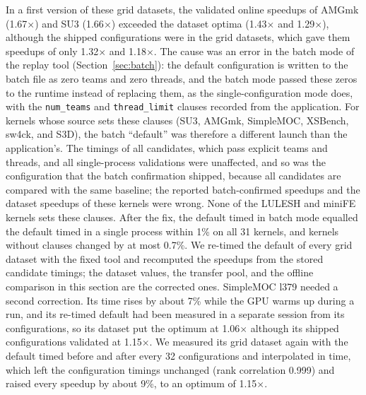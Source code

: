 \documentclass[10pt]{article}
\newcommand{\x}{\ensuremath{\times}}
\newcommand{\code}[1]{\texttt{#1}}
\begin{document}
In a first version of these grid datasets, the validated online speedups of
AMGmk (1.67\x{}) and SU3 (1.66\x{}) exceeded the dataset optima (1.43\x{} and
1.29\x{}), although the shipped configurations were in the grid datasets, which
gave them speedups of only 1.32\x{} and 1.18\x{}. The cause was an error in the
batch mode of the replay tool (Section~\ref{sec:batch}): the default
configuration is written to the batch file as zero teams and zero threads, and
the batch mode passed these zeros to the runtime instead of replacing them, as
the single-configuration mode does, with the \code{num\_teams} and
\code{thread\_limit} clauses recorded from the application. For kernels whose
source sets these clauses (SU3, AMGmk, SimpleMOC, XSBench, sw4ck, and S3D), the
batch ``default'' was therefore a different launch than the application's. The
timings of all candidates, which pass explicit teams and threads, and all
single-process validations were unaffected, and so was the configuration that
the batch confirmation shipped, because all candidates are compared with the
same baseline; the reported batch-confirmed speedups and the dataset speedups
of these kernels were wrong. None of the LULESH and miniFE kernels sets these
clauses. After the fix, the default timed in batch mode equalled the default
timed in a single process within 1\% on all 31 kernels, and kernels without
clauses changed by at most 0.7\%. We re-timed the default of every grid dataset
with the fixed tool and recomputed the speedups from the stored candidate
timings; the dataset values, the transfer pool, and the offline comparison
in this section are the corrected ones. SimpleMOC l379 needed a second correction. Its
time rises by about 7\% while the GPU warms up during a run, and its re-timed default had
been measured in a separate session from its configurations, so its dataset put the optimum
at 1.06\x{} although its shipped configurations validated at 1.15\x{}. We measured its
grid dataset again with the default timed before and after every 32 configurations and
interpolated in time, which left the configuration timings unchanged (rank correlation 0.999)
and raised every speedup by about 9\%, to an optimum of 1.15\x{}.
\end{document}
